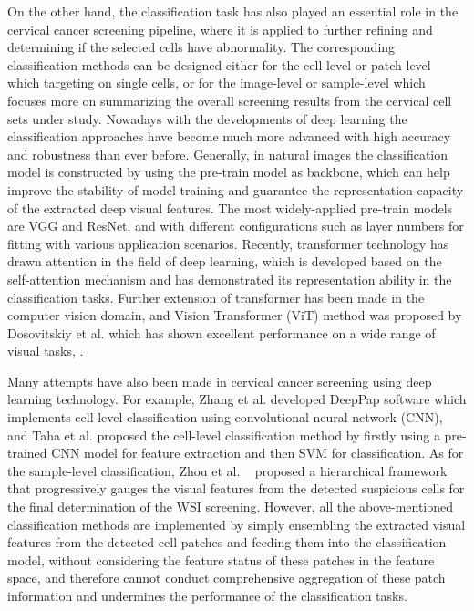 On the other hand, the classification task has also played an essential role in the cervical cancer screening pipeline, where it is applied to further refining and determining if the selected cells have abnormality. The corresponding classification methods can be designed either for the cell-level or patch-level which targeting on single cells, or for the image-level or sample-level which focuses more on summarizing the overall screening results from the cervical cell sets under study. Nowadays with the developments of deep learning the classification approaches have become much more advanced with high accuracy and robustness than ever before. Generally, in natural images the classification model is constructed by using the pre-train model as backbone, which can help improve the stability of model training and guarantee the representation capacity of the extracted deep visual features. The most widely-applied pre-train models are VGG and ResNet\cite{bizzego2019evaluating}, and with different configurations such as layer numbers for fitting with various application scenarios. Recently, transformer\cite{vaswani2017attention} technology has drawn attention in the field of deep learning, which is developed based on the self-attention mechanism and has demonstrated its representation ability in the classification tasks. Further extension of transformer has been made in the computer vision domain, and Vision Transformer (ViT) method was proposed by Dosovitskiy et al. \cite{dosovitskiy2020image} which has shown excellent performance on a wide range of visual tasks\cite{xu2022groupvit}, \cite{liu2022cvm}. 

Many attempts have also been made in cervical cancer screening using deep learning technology. For example, Zhang et al.\cite{zhang2019binary} developed DeepPap software which implements cell-level classification using convolutional neural network (CNN), and Taha et al.\cite{taha2017classification} proposed the cell-level classification method by firstly using a pre-trained CNN model for feature extraction and then SVM for classification. As for the sample-level classification, Zhou et al. ~\cite{zhou2021hierarchical} proposed a hierarchical framework that progressively gauges the visual features from the detected suspicious cells for the final determination of the WSI screening. However, all the above-mentioned classification methods are implemented by simply ensembling the extracted visual features from the detected cell patches and feeding them into the classification model, without considering the feature status of these patches in the feature space, and therefore cannot conduct comprehensive aggregation of these patch information and undermines the performance of the classification tasks. 


